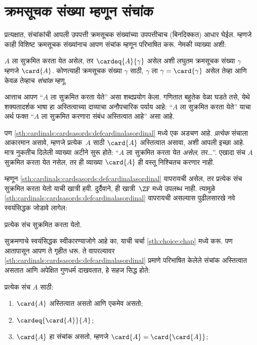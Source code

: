 \section{क्रमसूचक संख्या म्हणून संचांक}\label{sth:cardinals:cardsasords:sec}

प्रत्यक्षात, संचांकांची आपली उपपत्ती क्रमसूचक संख्यांच्या उपपत्तीचाच (बिनदिक्कत) आधार घेईल. म्हणजे काही विशिष्ट क्रमसूचक संख्यांनाच आपण संचांक म्हणून परिभाषित करू. नेमकी व्याख्या अशी:

\begin{defn}\label{sth:cardinals:cardsasords:defcardinalasordinal}
$A$ ला सुक्रमित करता येत असेल, तर $\cardeq{A}{\gamma}$ असेल अशी लघुतम क्रमसूचक संख्या $\gamma$ म्हणजे $\card{A}$. कोणत्याही क्रमसूचक संख्या $\gamma$ साठी, $\gamma$ ला $\gamma = \card{\gamma}$ असेल तेव्हा आणि केवळ तेव्हाच \emph{संचांक} म्हणू.
\end{defn}

आत्ताच आपण “$A$ ला सुक्रमित करता येते” असा शब्दप्रयोग केला. गणितात बहुतेक वेळा घडते तसे, येथे शक्यतादर्शक भाषा हा अस्तित्वाच्या दाव्याचा अनौपचारिक पर्याय आहे: “$A$ ला सुक्रमित करता येते” याचा अर्थ फक्त “$A$ ला सुक्रमित करणारा संबंध अस्तित्वात आहे” असा आहे.

पण \ref{sth:cardinals:cardsasords:defcardinalasordinal} मध्ये एक अडचण आहे. \emph{प्रत्येक} संचाला आकारमान असावे, म्हणजे प्रत्येक~$A$ साठी $\card{A}$ अस्तित्वात असावा, अशी आपली इच्छा आहे. मात्र नुकतीच दिलेली व्याख्या अटीने सुरू होते: “$A$ ला सुक्रमित करता येत \emph{असेल}, तर\ldots”. एखादा संच $A$ सुक्रमित करता येत नसेल, तर ही व्याख्या $\card{A}$ ही वस्तू निश्चितच करणार नाही.

म्हणून \ref{sth:cardinals:cardsasords:defcardinalasordinal} वापरायची असेल, तर प्रत्येक संच सुक्रमित करता येतो याची खात्री हवी. दुर्दैवाने, ही खात्री~$\ZF$ मध्ये उपलब्ध नाही. त्यामुळे \ref{sth:cardinals:cardsasords:defcardinalasordinal} वापरायची असल्यास पुढीलसारखे नवे स्वयंसिद्धक जोडावे लागेल:
\begin{axiom}[सुक्रमण]
प्रत्येक संच सुक्रमित करता येतो.
\end{axiom}
सुक्रमणाचे स्वयंसिद्धक स्वीकारण्याजोगे आहे का, याची चर्चा \ref{sth:choice:chap} मध्ये करू. पण आतापासून आपण ते गृहीत धरू. ते वापरल्यावर \ref{sth:cardinals:cardsasords:defcardinalasordinal} प्रमाणे परिभाषित केलेले संचांक अस्तित्वात असतात आणि अपेक्षित गुणधर्म दाखवतात, हे सहज सिद्ध होते:

\begin{lem}\label{sth:cardinals:cardsasords:lem:CardinalsExist}
प्रत्येक संच $A$ साठी:
\begin{enumerate}
  \item\label{sth:cardinals:cardsasords:cardaexists} $\card{A}$ अस्तित्वात असतो आणि एकमेव असतो;
  \item\label{sth:cardinals:cardsasords:cardaapprox} $\cardeq{\card{A}}{A}$;
  \item\label{sth:cardinals:cardsasords:cardaidem} $\card{A}$ हा संचांक असतो, म्हणजे
  $\card{A} = \card{\card{A}}$;
\end{enumerate}
\end{lem}

